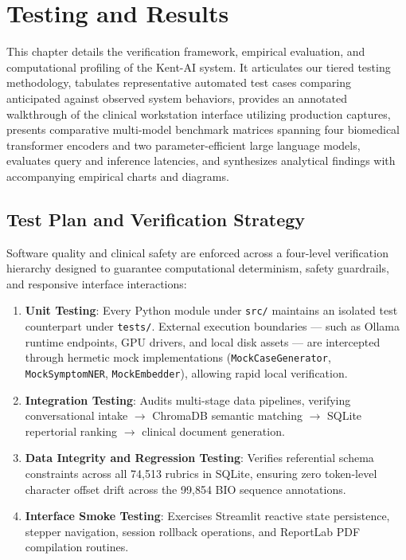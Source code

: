 
\chapter{Testing and Results}
\label{Chapter6}

This chapter details the verification framework, empirical evaluation, and computational profiling of the Kent-AI system. It articulates our tiered testing methodology, tabulates representative automated test cases comparing anticipated against observed system behaviors, provides an annotated walkthrough of the clinical workstation interface utilizing production captures, presents comparative multi-model benchmark matrices spanning four biomedical transformer encoders and two parameter-efficient large language models, evaluates query and inference latencies, and synthesizes analytical findings with accompanying empirical charts and diagrams.


\section{Test Plan and Verification Strategy}

Software quality and clinical safety are enforced across a four-level verification hierarchy designed to guarantee computational determinism, safety guardrails, and responsive interface interactions:

\begin{enumerate}
  \item \textbf{Unit Testing}: Every Python module under \texttt{src/} maintains an isolated test counterpart under \texttt{tests/}. External execution boundaries --- such as Ollama runtime endpoints, GPU drivers, and local disk assets --- are intercepted through hermetic mock implementations (\texttt{MockCaseGenerator}, \texttt{MockSymptomNER}, \texttt{MockEmbedder}), allowing rapid local verification.
  \item \textbf{Integration Testing}: Audits multi-stage data pipelines, verifying conversational intake $\to$ ChromaDB semantic matching $\to$ SQLite repertorial ranking $\to$ clinical document generation.
  \item \textbf{Data Integrity and Regression Testing}: Verifies referential schema constraints across all 74,513 rubrics in SQLite, ensuring zero token-level character offset drift across the 99,854 BIO sequence annotations.
  \item \textbf{Interface Smoke Testing}: Exercises Streamlit reactive state persistence, stepper navigation, session rollback operations, and ReportLab PDF compilation routines.
\end{enumerate}

